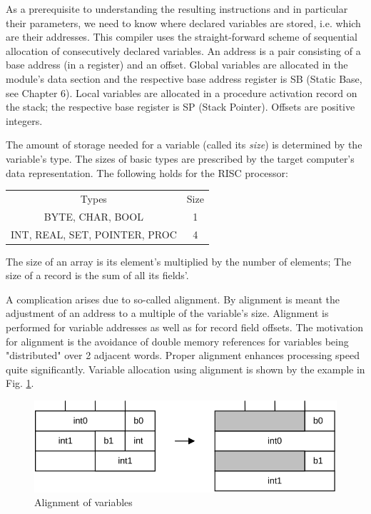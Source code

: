 As a prerequisite to understanding the resulting instructions and in particular their parameters, we
need to know where declared variables are stored, i.e. which are their addresses. This compiler
uses the straight-forward scheme of sequential allocation of consecutively declared variables. An
address is a pair consisting of a base address (in a register) and an offset. Global variables are
allocated in the module's data section and the respective base address register is SB (Static Base,
see Chapter 6). Local variables are allocated in a procedure activation record on the stack; the
respective base register is SP (Stack Pointer). Offsets are positive integers.

The amount of storage needed for a variable (called its \emph{size}) is determined by the variable's
type.  The sizes of basic types are prescribed by the target computer's data representation.
The following holds for the RISC processor:
\begin{table}[h!]
  \centering
  \begin{tabular}{c c}
    Types                         & Size \\
    BYTE, CHAR, BOOL              & 1 \\
    INT, REAL, SET, POINTER, PROC & 4
  \end{tabular}
\end{table}

The size of an array is its element's multiplied by the number of elements; The size of a record is
the sum of all its fields'.

A complication arises due to so-called alignment. By alignment is meant the adjustment of an
address to a multiple of the variable's size. Alignment is performed for variable addresses as well
as for record field offsets. The motivation for alignment is the avoidance of double memory
references for variables being "distributed" over 2 adjacent words. Proper alignment enhances
processing speed quite significantly. Variable allocation using alignment is shown by the example
in Fig. \ref{fig:varalign}.
\begin{figure}[h!]
  \centering
  \includegraphics[width=.75\textwidth]{i/C/2.png}
  \caption{Alignment of variables}
  \label{fig:varalign}
\end{figure}


